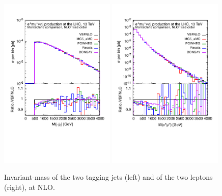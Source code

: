 \documentclass[a4paper,10pt]{report}
\begin{document}
\begin{figure}[h!]
   \centering
   \includegraphics[width=0.49\textwidth,angle=0,clip=true,trim={0.4cm 2.5cm 0.6cm 1.cm}]{figures/mjj_NLO.pdf}
   \includegraphics[width=0.49\textwidth,angle=0,clip=true,trim={0.4cm 2.5cm 0.6cm 1.cm}]{figures/mll_NLO.pdf}
\caption{\label{fig:mjj-llNLO}Invariant-mass of the two tagging jets (left) and of the two leptons (right), at NLO.
}
\end{figure}
%
\end{document}
